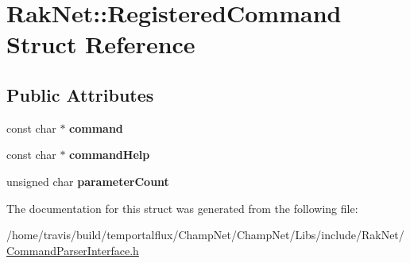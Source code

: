 \hypertarget{struct_rak_net_1_1_registered_command}{\section{Rak\-Net\-:\-:Registered\-Command Struct Reference}
\label{struct_rak_net_1_1_registered_command}
}
\subsection*{Public Attributes}
\begin{DoxyCompactItemize}
\item 
\hypertarget{struct_rak_net_1_1_registered_command_af0edae003f0080c74f1a49ecfb96c544}{const char $\ast$ {\bfseries command}}\label{struct_rak_net_1_1_registered_command_af0edae003f0080c74f1a49ecfb96c544}

\item 
\hypertarget{struct_rak_net_1_1_registered_command_ab4410975892b4350da46f9142539b691}{const char $\ast$ {\bfseries command\-Help}}\label{struct_rak_net_1_1_registered_command_ab4410975892b4350da46f9142539b691}

\item 
\hypertarget{struct_rak_net_1_1_registered_command_addb68bf9fe0633d51e3639992b68f1c2}{unsigned char {\bfseries parameter\-Count}}\label{struct_rak_net_1_1_registered_command_addb68bf9fe0633d51e3639992b68f1c2}

\end{DoxyCompactItemize}


The documentation for this struct was generated from the following file\-:\begin{DoxyCompactItemize}
\item 
/home/travis/build/temportalflux/\-Champ\-Net/\-Champ\-Net/\-Libs/include/\-Rak\-Net/\hyperlink{_command_parser_interface_8h}{Command\-Parser\-Interface.\-h}\end{DoxyCompactItemize}
